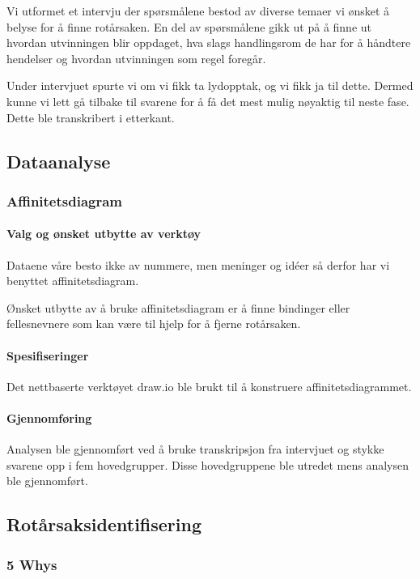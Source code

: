 Vi utformet et intervju der spørsmålene bestod av diverse temaer vi ønsket å belyse for å finne rotårsaken. En del av spørsmålene gikk ut på å finne ut hvordan utvinningen blir oppdaget, hva slags handlingsrom de har for å håndtere hendelser og hvordan utvinningen som regel foregår.

Under intervjuet spurte vi om vi fikk ta lydopptak, og vi fikk ja til dette. Dermed kunne vi lett gå tilbake til svarene for å få det mest mulig nøyaktig til neste fase. Dette ble transkribert i etterkant. 

\subsection{Dataanalyse}
\subsubsection{Affinitetsdiagram}

\paragraph{Valg og ønsket utbytte av verktøy}
Dataene våre besto ikke av nummere, men meninger og idéer så derfor har vi benyttet affinitetsdiagram.

Ønsket utbytte av å bruke affinitetsdiagram er å finne bindinger eller fellesnevnere som kan være til hjelp for å fjerne rotårsaken.

\paragraph{Spesifiseringer}
Det nettbaserte verktøyet draw.io ble brukt til å konstruere affinitetsdiagrammet.

\paragraph{Gjennomføring}
Analysen ble gjennomført ved å bruke transkripsjon fra intervjuet og stykke svarene opp i fem hovedgrupper. Disse hovedgruppene ble utredet mens analysen ble gjennomført.

\subsection{Rotårsaksidentifisering}
\subsubsection{5 Whys}

